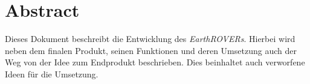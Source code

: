 \chapter{Abstract}
Dieses Dokument beschreibt die Entwicklung des \textit{EarthROVERs}. Hierbei wird neben dem finalen Produkt, seinen Funktionen und deren Umsetzung auch der Weg von der Idee zum Endprodukt beschrieben. Dies beinhaltet auch verworfene Ideen für die Umsetzung.